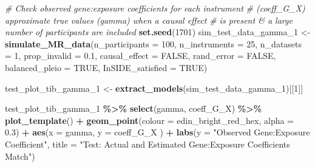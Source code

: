 \documentclass[
]{article}
\newenvironment{Shaded}{\begin{snugshade}}{\end{snugshade}}
\newcommand{\AttributeTok}[1]{\textcolor[rgb]{0.13,0.29,0.53}{#1}}
\newcommand{\CommentTok}[1]{\textcolor[rgb]{0.56,0.35,0.01}{\textit{#1}}}
\newcommand{\ConstantTok}[1]{\textcolor[rgb]{0.56,0.35,0.01}{#1}}
\newcommand{\DecValTok}[1]{\textcolor[rgb]{0.00,0.00,0.81}{#1}}
\newcommand{\FloatTok}[1]{\textcolor[rgb]{0.00,0.00,0.81}{#1}}
\newcommand{\FunctionTok}[1]{\textcolor[rgb]{0.13,0.29,0.53}{\textbf{#1}}}
\newcommand{\NormalTok}[1]{#1}
\newcommand{\OtherTok}[1]{\textcolor[rgb]{0.56,0.35,0.01}{#1}}
\newcommand{\SpecialCharTok}[1]{\textcolor[rgb]{0.81,0.36,0.00}{\textbf{#1}}}
\newcommand{\StringTok}[1]{\textcolor[rgb]{0.31,0.60,0.02}{#1}}
\begin{document}
\begin{Shaded}
\begin{Highlighting}[]
\CommentTok{\# Check observed gene:exposure coefficients for each instrument}
\CommentTok{\# (coeff\_G\_X) approximate true values (gamma) when a causal effect}
\CommentTok{\# is present \& a large number of participants are included}
 \FunctionTok{set.seed}\NormalTok{(}\DecValTok{1701}\NormalTok{)}
\NormalTok{ sim\_test\_data\_gamma\_1 }\OtherTok{\textless{}{-}} \FunctionTok{simulate\_MR\_data}\NormalTok{(}\AttributeTok{n\_participants =} \DecValTok{100}\NormalTok{,}
                                           \AttributeTok{n\_instruments =} \DecValTok{25}\NormalTok{,}
                                           \AttributeTok{n\_datasets =} \DecValTok{1}\NormalTok{,}
                                           \AttributeTok{prop\_invalid =} \FloatTok{0.1}\NormalTok{,}
                                           \AttributeTok{causal\_effect =} \ConstantTok{FALSE}\NormalTok{,}
                                           \AttributeTok{rand\_error =} \ConstantTok{FALSE}\NormalTok{,}
                                           \AttributeTok{balanced\_pleio =} \ConstantTok{TRUE}\NormalTok{,}
                                           \AttributeTok{InSIDE\_satisfied =} \ConstantTok{TRUE}\NormalTok{)}


\NormalTok{ test\_plot\_tib\_gamma\_1 }\OtherTok{\textless{}{-}} \FunctionTok{extract\_models}\NormalTok{(sim\_test\_data\_gamma\_1)[[}\DecValTok{1}\NormalTok{]]}

\NormalTok{ test\_plot\_tib\_gamma\_1 }\SpecialCharTok{\%\textgreater{}\%}
   \FunctionTok{select}\NormalTok{(gamma, coeff\_G\_X) }\SpecialCharTok{\%\textgreater{}\%}
   \FunctionTok{plot\_template}\NormalTok{() }\SpecialCharTok{+}
   \FunctionTok{geom\_point}\NormalTok{(}\AttributeTok{colour =}\NormalTok{ edin\_bright\_red\_hex, }\AttributeTok{alpha =} \FloatTok{0.3}\NormalTok{) }\SpecialCharTok{+}
   \FunctionTok{aes}\NormalTok{(}\AttributeTok{x =}\NormalTok{ gamma, }\AttributeTok{y =}\NormalTok{ coeff\_G\_X ) }\SpecialCharTok{+}
   \FunctionTok{labs}\NormalTok{(}\AttributeTok{y =} \StringTok{"Observed Gene:Exposure Coefficient"}\NormalTok{,}
        \AttributeTok{title =} \StringTok{"Test: Actual and Estimated Gene:Exposure Coefficients Match"}\NormalTok{)}
\end{Highlighting}
\end{Shaded}
\end{document}
